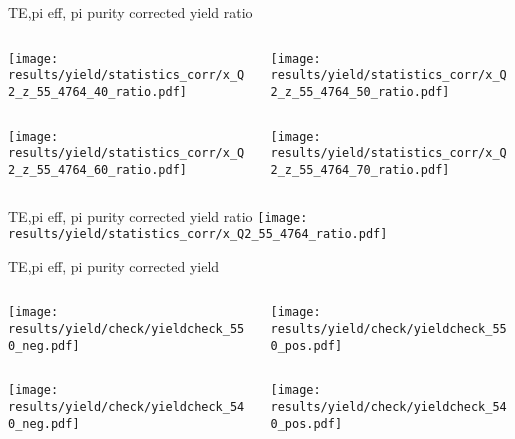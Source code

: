\begin{frame}{TE,pi eff, pi purity corrected yield ratio}
\begin{columns}
\begin{column}[T]{0.5\textwidth}
\texttt{[image: results/yield/statistics\_corr/x\_Q2\_z\_55\_4764\_40\_ratio.pdf]}
\end{column}
\begin{column}[T]{0.5\textwidth}
\texttt{[image: results/yield/statistics\_corr/x\_Q2\_z\_55\_4764\_50\_ratio.pdf]}
\end{column}
\end{columns}
\begin{columns}
\begin{column}[T]{0.5\textwidth}
\texttt{[image: results/yield/statistics\_corr/x\_Q2\_z\_55\_4764\_60\_ratio.pdf]}
\end{column}
\begin{column}[T]{0.5\textwidth}
\texttt{[image: results/yield/statistics\_corr/x\_Q2\_z\_55\_4764\_70\_ratio.pdf]}
\end{column}
\end{columns}
\end{frame}
\begin{frame}{TE,pi eff, pi purity corrected yield ratio}
\texttt{[image: results/yield/statistics\_corr/x\_Q2\_55\_4764\_ratio.pdf]}
\end{frame}
\begin{frame}{TE,pi eff, pi purity corrected yield}
\begin{columns}
\begin{column}[T]{0.5\textwidth}
\texttt{[image: results/yield/check/yieldcheck\_550\_neg.pdf]}
\end{column}
\begin{column}[T]{0.5\textwidth}
\texttt{[image: results/yield/check/yieldcheck\_550\_pos.pdf]}
\end{column}
\end{columns}
\begin{columns}
\begin{column}[T]{0.5\textwidth}
\texttt{[image: results/yield/check/yieldcheck\_540\_neg.pdf]}
\end{column}
\begin{column}[T]{0.5\textwidth}
\texttt{[image: results/yield/check/yieldcheck\_540\_pos.pdf]}
\end{column}
\end{columns}
\end{frame}
